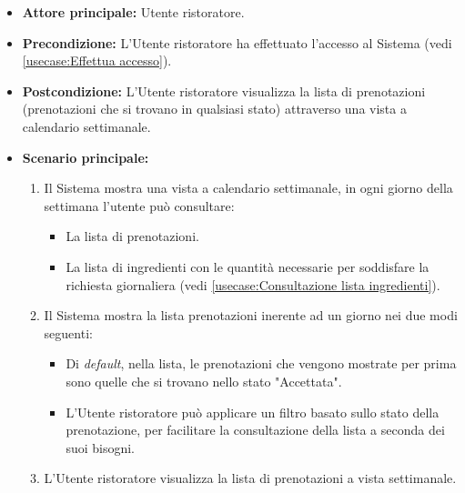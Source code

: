 \label{usecase:Consultazione lista prenotazioni}
\begin{itemize}
	\item \textbf{Attore principale:} Utente ristoratore.

	\item \textbf{Precondizione:} L'Utente ristoratore ha effettuato l'accesso al Sistema (vedi \autoref{usecase:Effettua accesso}).

	\item \textbf{Postcondizione:} L'Utente ristoratore visualizza la lista di prenotazioni (prenotazioni che si trovano in qualsiasi stato) attraverso una vista a calendario settimanale.

	\item \textbf{Scenario principale:}
	      \begin{enumerate}
		      \item Il Sistema mostra una vista a calendario settimanale, in ogni giorno della settimana l'utente può consultare:
		      \begin{itemize}
				\item La lista di prenotazioni.
				\item La lista di ingredienti con le quantità necessarie per soddisfare la richiesta giornaliera (vedi \autoref{usecase:Consultazione lista ingredienti}).
			  \end{itemize} 

		      \item Il Sistema mostra la lista prenotazioni inerente ad un giorno nei due modi seguenti:
		      \begin{itemize}
				\item Di \textit{default}, nella lista, le prenotazioni che vengono mostrate per prima sono quelle che si trovano nello stato "Accettata".
				\item L'Utente ristoratore può applicare un filtro basato sullo stato della prenotazione, per facilitare la consultazione della lista a seconda dei suoi bisogni.
			  \end{itemize}

		      \item L'Utente ristoratore visualizza la lista di prenotazioni a vista settimanale.
	      \end{enumerate}
\end{itemize}


